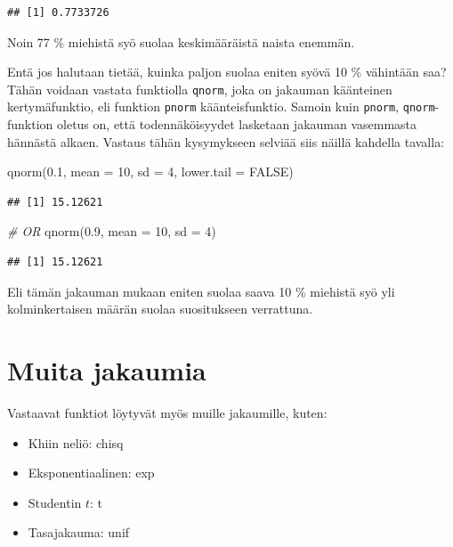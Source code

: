 \documentclass[
]{book}
\newenvironment{Shaded}{\begin{snugshade}}{\end{snugshade}}
\newcommand{\AttributeTok}[1]{\textcolor[rgb]{0.77,0.63,0.00}{#1}}
\newcommand{\CommentTok}[1]{\textcolor[rgb]{0.56,0.35,0.01}{\textit{#1}}}
\newcommand{\ConstantTok}[1]{\textcolor[rgb]{0.00,0.00,0.00}{#1}}
\newcommand{\DecValTok}[1]{\textcolor[rgb]{0.00,0.00,0.81}{#1}}
\newcommand{\FloatTok}[1]{\textcolor[rgb]{0.00,0.00,0.81}{#1}}
\newcommand{\FunctionTok}[1]{\textcolor[rgb]{0.00,0.00,0.00}{#1}}
\newcommand{\NormalTok}[1]{#1}
\providecommand{\tightlist}{%
  \setlength{\itemsep}{0pt}\setlength{\parskip}{0pt}}
\begin{document}
\begin{verbatim}
## [1] 0.7733726
\end{verbatim}

Noin 77 \% miehistä syö suolaa keskimääräistä naista enemmän.

Entä jos halutaan tietää, kuinka paljon suolaa eniten syövä 10 \% vähintään saa? Tähän voidaan vastata funktiolla \texttt{qnorm}, joka on jakauman käänteinen kertymäfunktio, eli funktion \texttt{pnorm} käänteisfunktio. Samoin kuin \texttt{pnorm}, \texttt{qnorm}-funktion oletus on, että todennäköisyydet lasketaan jakauman vasemmasta hännästä alkaen. Vastaus tähän kysymykseen selviää siis näillä kahdella tavalla:

\begin{Shaded}
\begin{Highlighting}[]
\FunctionTok{qnorm}\NormalTok{(}\FloatTok{0.1}\NormalTok{, }\AttributeTok{mean =} \DecValTok{10}\NormalTok{, }\AttributeTok{sd =} \DecValTok{4}\NormalTok{, }\AttributeTok{lower.tail =} \ConstantTok{FALSE}\NormalTok{)}
\end{Highlighting}
\end{Shaded}

\begin{verbatim}
## [1] 15.12621
\end{verbatim}

\begin{Shaded}
\begin{Highlighting}[]
\CommentTok{\# OR}
\FunctionTok{qnorm}\NormalTok{(}\FloatTok{0.9}\NormalTok{, }\AttributeTok{mean =} \DecValTok{10}\NormalTok{, }\AttributeTok{sd =} \DecValTok{4}\NormalTok{)}
\end{Highlighting}
\end{Shaded}

\begin{verbatim}
## [1] 15.12621
\end{verbatim}

Eli tämän jakauman mukaan eniten suolaa saava 10 \% miehistä syö yli kolminkertaisen määrän suolaa suositukseen verrattuna.

\hypertarget{muita-jakaumia}{%
\section{Muita jakaumia}\label{muita-jakaumia}}

Vastaavat funktiot löytyvät myös muille jakaumille, kuten:

\begin{itemize}
\tightlist
\item
  Khiin neliö: chisq
\item
  Eksponentiaalinen: exp
\item
  Studentin \(t\): t
\item
  Tasajakauma: unif
\end{itemize}
\end{document}
